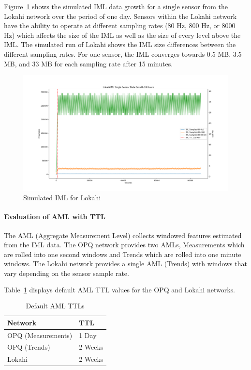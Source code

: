 Figure~\ref{fig:sim_iml_lokahi} shows the simulated IML data growth for a single sensor from the Lokahi network over the period of one day. Sensors within the Lokahi network have the ability to operate at different sampling rates (80 Hz, 800 Hz, or 8000 Hz) which affects the size of the IML as well as the size of every level above the IML. The simulated run of Lokahi shows the IML size differences between the different sampling rates. For one sensor, the IML converges towards 0.5 MB, 3.5 MB, and 33 MB for each sampling rate after 15 minutes.

\begin{figure}[H]
	\centering
	\includegraphics[width=\linewidth]{figures/sim_iml_lokahi.png}
	\caption{Simulated IML for Lokahi}
	\label{fig:sim_iml_lokahi}
\end{figure}

\paragraph{Evaluation of AML with TTL}
The AML (Aggregate Measurement Level) collects windowed features estimated from the IML data. The OPQ network provides two AMLs, Measurements which are rolled into one second windows and Trends which are rolled into one minute windows. The Lokahi network provides a single AML (Trends) with windows that vary depending on the sensor sample rate.

Table~\ref{table:ttls_aml} displays default AML TTL values for the OPQ and Lokahi networks.

\begin{table}[H]
	\centering
	\caption{Default AML TTLs}
	\begin{tabularx}{\textwidth}{Xl}
		\toprule
		\textbf{Network} & \textbf{TTL} \\
		\midrule
		OPQ (Measurements) & 1 Day \\
        OPQ (Trends) & 2 Weeks \\
        Lokahi & 2 Weeks \\
		\bottomrule
	\end{tabularx}
	\label{table:ttls_aml}
\end{table}

